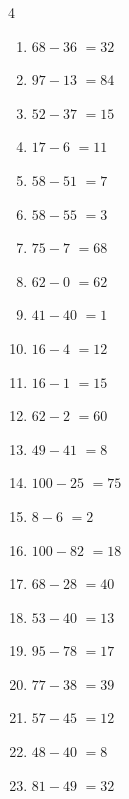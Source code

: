 \begin{multicols}{4}
\begin{enumerate}
  \item $68-36$
        $=32$

  \item $97-13$
        $=84$

  \item $52-37$
        $=15$

  \item $17-6$
        $=11$

  \item $58-51$
        $=7$

  \item $58-55$
        $=3$

  \item $75-7$
        $=68$

  \item $62-0$
        $=62$

  \item $41-40$
        $=1$

  \item $16-4$
        $=12$

  \item $16-1$
        $=15$

  \item $62-2$
        $=60$

  \item $49-41$
        $=8$

  \item $100-25$
        $=75$

  \item $8-6$
        $=2$

  \item $100-82$
        $=18$

  \item $68-28$
        $=40$

  \item $53-40$
        $=13$

  \item $95-78$
        $=17$

  \item $77-38$
        $=39$

  \item $57-45$
        $=12$

  \item $48-40$
        $=8$

\columnbreak %

  \item $81-49$
        $=32$


\end{enumerate}
\end{multicols}
